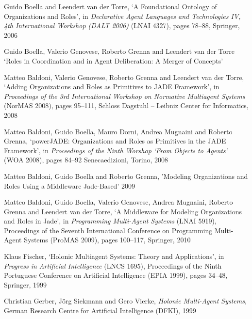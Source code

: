\begin{thebibliography}{99}
Guido Boella and Leendert van der Torre,
`A Foundational Ontology of Organizations and Roles',
in \textit{Declarative Agent Languages and Technologies IV, 4th International Workshop (DALT 2006)} (LNAI 4327),
pages 78--88,
Springer, 2006

Guido Boella, Valerio Genovese, Roberto Grenna and Leendert van der Torre
`Roles in Coordination and in Agent Deliberation: A Merger of Concepts'


Matteo Baldoni, Valerio Genovese, Roberto Grenna and Leendert van der Torre,
`Adding Organizations and Roles as Primitives to JADE Framework',
in \textit{Proceedings of the 3rd International Workshop on Normative Multiagent Systems} (NorMAS 2008),
pages 95--111,
Schloss Dagstuhl -- Leibniz Center for Informatics, 2008

Matteo Baldoni, Guido Boella, Mauro Dorni, Andrea Mugnaini and Roberto Grenna,
`powerJADE: Organizations and Roles as Primitives in the JADE Framework',
in \textit{Proceedings of the Ninth Worshop `From Objects to Agents'} (WOA 2008),
pages 84--92
Senecaedizioni, Torino, 2008

Matteo Baldoni, Guido Boella and Roberto Grenna,
'Modeling Organizations and Roles Using a Middleware Jade-Based'
2009

Matteo Baldoni, Guido Boella, Valerio Genovese, Andrea Mugnaini, Roberto Grenna and Leendert van der Torre,
`A Middleware for Modeling Organizations and Roles in Jade',
in \textit{Programming Multi-Agent Systems} (LNAI 5919),
Proceedings of the Seventh International Conference on Programming Multi-Agent Systems (ProMAS 2009),
pages 100--117, 
Springer, 2010


Klaus Fischer,
`Holonic Multiagent Systems: Theory and Applications',
in \textit{Progress in Artificial Intelligence} (LNCS 1695),
Proceedings of the Ninth Portuguese Conference on Artificial Intelligence (EPIA 1999),
pages 34--48,
Springer, 1999

Christian Gerber, J\"{o}rg Siekmann and Gero Vierke,
\textit{Holonic Multi-Agent Systems},
German Research Centre for Artificial Intelligence (DFKI), 1999


\end{thebibliography}

